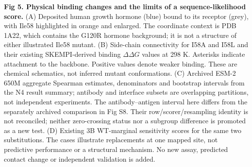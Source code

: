\caption{{\bf Fig 5. Physical binding changes and the limits of a sequence-likelihood score.} (A) Deposited human growth hormone (blue) bound to its receptor (grey), with Ile58 highlighted in orange and enlarged. The coordinate context is PDB 1A22, which contains the G120R hormone background; it is not a structure of either illustrated Ile58 mutant. (B) Side-chain connectivity for I58A and I58L and their existing SKEMPI-derived binding $\Delta\Delta G$ values at 298 K. Asterisks indicate attachment to the backbone. Positive values denote weaker binding. These are chemical schematics, not inferred mutant conformations. (C) Archived ESM-2 650M aggregate Spearman estimates, denominators and bootstrap intervals from the N4 result summary; antibody and interface subsets are overlapping partitions, not independent experiments. The antibody--antigen interval here differs from the separately archived comparison in Fig S8. Their row/scorer/resampling identity is not reconciled; neither zero-crossing status nor a subgroup difference is promoted as a new test. (D) Existing 3B WT-marginal sensitivity scores for the same two substitutions. The cases illustrate replacements at one mapped site, not predictive performance or a structural mechanism. No new assay, predicted contact change or independent validation is added.}
